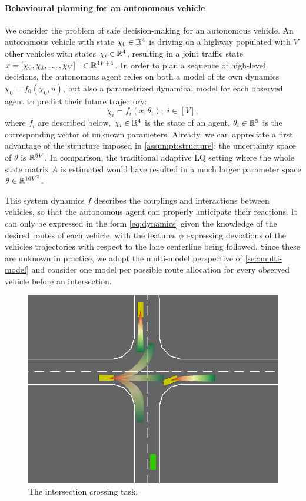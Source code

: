 \documentclass{article}
\begin{document}
\paragraph{Behavioural planning for an autonomous vehicle}
We consider the problem of safe decision-making for an autonomous vehicle. An autonomous vehicle with state $\chi_0\in\mathbb{R}^4$ is driving on a highway populated with $V$ other vehicles with states $\chi_i\in\mathbb{R}^4$, resulting in a joint traffic state $x = [\chi_0, \chi_1,\dots,\chi_V]^\top\in\mathbb{R}^{4V+4}$. In order to plan a sequence of high-level decisions, the autonomous agent relies on both a model of its own dynamics $\chi_0 = f_0(\chi_0,u)$, but also a parametrized dynamical model for each observed agent to predict their future trajectory: \[\dot{\chi}_i=f_i(x,\theta_i),\;i\in[V],\] where $f_i$ are described below, $\chi_i\in\mathbb{R}^4$ is the state of an agent, $\theta_i\in\mathbb{R}^5$ is the corresponding vector of unknown parameters. Already, we can appreciate a first advantage of the structure imposed in \autoref{assumpt:structure}: the uncertainty space of $\theta$ is $\mathbb{R}^{5V}$. In comparison, the traditional adaptive LQ setting where the whole state matrix $A$ is estimated would have resulted in a much larger parameter space $\theta\in\mathbb{R}^{16V^2}$.

This system dynamics $f$ describes the couplings and interactions between vehicles, so that the autonomous agent can properly anticipate their reactions. It can only be expressed in the form \eqref{eq:dynamics} given the knowledge of the desired routes of each vehicle, with the features $\phi$ expressing deviations of the vehicles trajectories with respect to the lane centerline being followed. Since these are unknown in practice, we adopt the multi-model perspective of \autoref{sec:multi-model} and consider one model per possible route allocation for every observed vehicle before an intersection.

\begin{figure}
	\centering
	\includegraphics[width=0.8\linewidth]{img/highway-small}
	\caption{The intersection crossing task.}
\end{figure}
\end{document}
